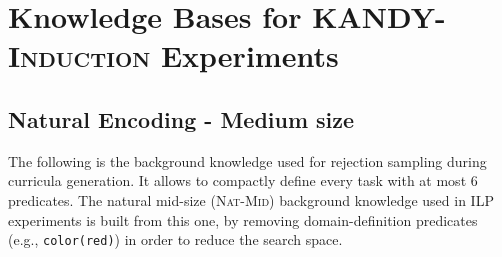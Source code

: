 \chapter{Knowledge Bases for \textsc{KANDY-Induction} Experiments}\label{app:kandyaleph}

\section{Natural Encoding - Medium size}
The following is the background knowledge used for rejection sampling during curricula generation. It allows to compactly define every task with at most 6 predicates.
The natural mid-size ({\small\textsc{Nat-Mid}}) background knowledge used in ILP experiments is built from this one, by removing domain-definition predicates (e.g., \texttt{color(red)}) in order to reduce the search space.
$\ $\\

